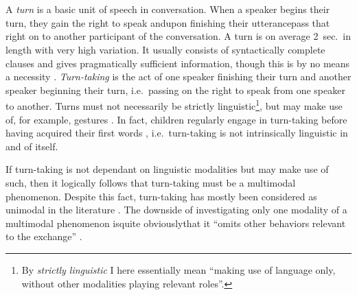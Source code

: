 
\chapter{\introduction}
\label{ch:introduction}
A \emph{turn} is a basic unit of speech in conversation.
When a speaker begins their turn, they gain the right to speak and\dash upon finishing their utterance\dash pass that right on to another participant of the conversation.
A turn is on average 2~sec.\ in length with very high variation.
It usually consists of syntactically complete clauses and gives pragmatically sufficient information, though this is by no means a necessity \citep[]{levinson_turn-taking_2016}.
\emph{Turn-taking} is the act of one speaker finishing their turn and another speaker beginning their turn, i.e.\ passing on the right to speak from one speaker to another. %
Turns must not necessarily be strictly linguistic\footnote{By \emph{strictly linguistic} I here essentially mean ``making use of language only, without other modalities playing relevant roles''.}, but may make use of, for example, gestures \citep{missingsource}. %
In fact, children regularly engage in turn-taking before having acquired their first words \citep[]{casillas_turn-taking_2016}, i.e.\ turn-taking is not intrinsically linguistic in and of itself.

If turn-taking is not dependant on linguistic modalities but may make use of such, then it logically follows that turn-taking must be a multimodal phenomenon.
Despite this fact, turn-taking has mostly been considered as unimodal in the literature \citep[]{rohlfing_multimodal_nodate}.
The downside of investigating only one modality of a multimodal phenomenon is\dash quite obviously\dash that it ``omits other behaviors relevant to the exchange'' \citep[]{rohlfing_multimodal_nodate}.

